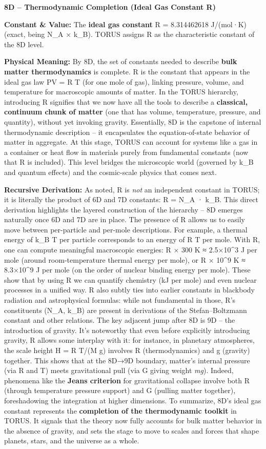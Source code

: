 \textbf{8D -- Thermodynamic Completion (Ideal Gas Constant R)}

\textbf{Constant \& Value:} The \textbf{ideal gas constant} R =
8.314462618 J/(mol·K) (exact, being N\_A × k\_B)​. TORUS assigns R as
the characteristic constant of the 8D level.

\textbf{Physical Meaning:} By 8D, the set of constants needed to
describe \textbf{bulk matter thermodynamics} is complete. R is the
constant that appears in the ideal gas law PV = R T (for one mole of
gas), linking pressure, volume, and temperature for macroscopic amounts
of matter​. In the TORUS hierarchy, introducing R signifies that we now
have all the tools to describe a \textbf{classical, continuum chunk of
matter} (one that has volume, temperature, pressure, and quantity),
without yet invoking gravity. Essentially, 8D is the capstone of
internal thermodynamic description -- it encapsulates the
equation-of-state behavior of matter in aggregate. At this stage, TORUS
can account for systems like a gas in a container or heat flow in
materials purely from fundamental constants (now that R is included).
This level bridges the microscopic world (governed by k\_B and quantum
effects) and the cosmic-scale physics that comes next.

\textbf{Recursive Derivation:} As noted, R is \emph{not} an independent
constant in TORUS; it is literally the product of 6D and 7D constants: R
= N\_A · k\_B​. This direct derivation highlights the layered
construction of the hierarchy -- 8D emerges naturally once 6D and 7D are
in place. The presence of R allows us to easily move between
per-particle and per-mole descriptions. For example, a thermal energy of
k\_B T per particle corresponds to an energy of R T per mole. With R,
one can compute meaningful macroscopic energies: R × 300 K ≈ 2.5×10\^{}3
J per mole (around room-temperature thermal energy per mole), or R ×
10\^{}9 K ≈ 8.3×10\^{}9 J per mole (on the order of nuclear binding
energy per mole)​. These show that by using R we can quantify chemistry
(kJ per mole) and even nuclear processes in a unified way. R also subtly
ties into earlier constants in blackbody radiation and astrophysical
formulas: while not fundamental in those, R's constituents (N\_A, k\_B)
are present in derivations of the Stefan--Boltzmann constant and other
relations​. The key adjacent jump after 8D is 9D -- the introduction of
gravity. It's noteworthy that even before explicitly introducing
gravity, R allows some interplay with it: for instance, in planetary
atmospheres, the scale height H = R T/(M g) involves R (thermodynamics)
and g (gravity) together​. This shows that at the 8D→9D boundary,
matter's internal pressure (via R and T) meets gravitational pull (via G
giving weight \emph{mg}). Indeed, phenomena like the \textbf{Jeans
criterion} for gravitational collapse involve both R (through
temperature pressure support) and G (pulling matter together),
foreshadowing the integration at higher dimensions. To summarize, 8D's
ideal gas constant represents the \textbf{completion of the
thermodynamic toolkit} in TORUS. It signals that the theory now fully
accounts for bulk matter behavior in the absence of gravity, and sets
the stage to move to scales and forces that shape planets, stars, and
the universe as a whole.

